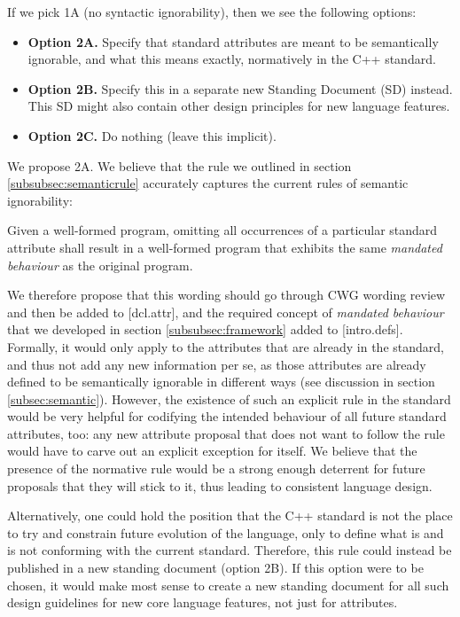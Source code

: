 If we pick 1A (no syntactic ignorability), then we see the following options:

\begin{itemize}
\item \textbf{Option 2A.} Specify that standard attributes are meant to be semantically ignorable, and what this means exactly, normatively in the C++ standard.
\item \textbf{Option 2B.} Specify this in a separate new Standing Document (SD) instead. This SD might also contain other design principles for new language features.
\item \textbf{Option 2C.} Do nothing (leave this implicit).
\end{itemize}

We propose 2A. We believe that the rule we outlined in section \ref{subsubsec:semanticrule} accurately captures the current rules of semantic ignorability:
\begin{adjustwidth}{0.5cm}{0.5cm}
Given a well-formed program, omitting all occurrences of a particular standard attribute shall result in a well-formed program that exhibits the same \emph{mandated behaviour} as the original program.
\end{adjustwidth}
We therefore propose that this wording should go through CWG wording review and then be added to [dcl.attr], and the required concept of \emph{mandated behaviour} that we developed in section \ref{subsubsec:framework} added to [intro.defs]. Formally, it would only apply to the attributes that are already in the standard, and thus not add any new information per se, as those attributes are already defined to be semantically ignorable in different ways (see discussion in section \ref{subsec:semantic}). However, the existence of such an explicit rule in the standard would be very helpful for codifying the intended behaviour of all future standard attributes, too: any new attribute proposal that does not want to follow the rule would have to carve out an explicit exception for itself. We believe that the presence of the normative rule would be a strong enough deterrent for future proposals that they will stick to it, thus leading to consistent language design.

Alternatively, one could hold the position that the C++ standard is not the place to try and constrain future evolution of the language, only to define what is and is not conforming with the current standard. Therefore, this rule could instead be published in a new standing document (option 2B). If this option were to be chosen, it would make most sense to create a new standing document for all such design guidelines for new core language features, not just for attributes.

